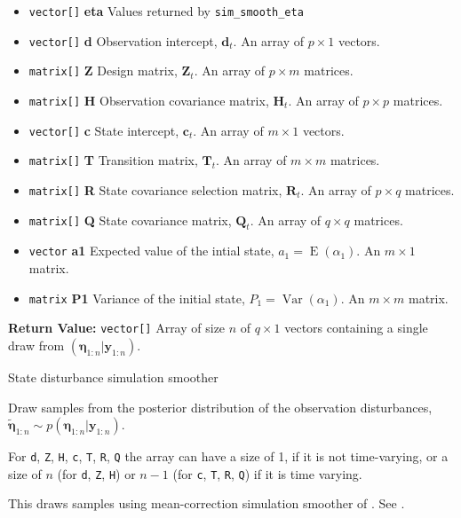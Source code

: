 \documentclass[]{book}
\providecommand{\tightlist}{%
  \setlength{\itemsep}{0pt}\setlength{\parskip}{0pt}}
\DeclareMathOperator{\E}{E}
\DeclareMathOperator{\Var}{Var}
\newcommand{\mat}[1]{\boldsymbol{#1}}
\renewcommand{\vec}[1]{\boldsymbol{#1}}
\begin{document}
\begin{itemize}
\tightlist
\item
  \texttt{vector{[}{]}} \textbf{eta} Values returned by
  \texttt{sim\_smooth\_eta}
\item
  \texttt{vector{[}{]}} \textbf{d} Observation intercept, \(\vec{d}_t\).
  An array of \(p \times 1\) vectors.
\item
  \texttt{matrix{[}{]}} \textbf{Z} Design matrix, \(\mat{Z}_t\). An
  array of \(p \times m\) matrices.
\item
  \texttt{matrix{[}{]}} \textbf{H} Observation covariance matrix,
  \(\mat{H}_t\). An array of \(p \times p\) matrices.
\item
  \texttt{vector{[}{]}} \textbf{c} State intercept, \(\vec{c}_t\). An
  array of \(m \times 1\) vectors.
\item
  \texttt{matrix{[}{]}} \textbf{T} Transition matrix, \(\mat{T}_t\). An
  array of \(m \times m\) matrices.
\item
  \texttt{matrix{[}{]}} \textbf{R} State covariance selection matrix,
  \(\mat{R} _t\). An array of \(p \times q\) matrices.
\item
  \texttt{matrix{[}{]}} \textbf{Q} State covariance matrix,
  \(\mat{Q}_t\). An array of \(q \times q\) matrices.
\item
  \texttt{vector} \textbf{a1} Expected value of the intial state,
  \(a_1 = \E(\alpha_1)\). An \(m \times 1\) matrix.
\item
  \texttt{matrix} \textbf{P1} Variance of the initial state,
  \(P_1 = \Var(\alpha_1)\). An \(m \times m\) matrix.
\end{itemize}

\textbf{Return Value:} \texttt{vector{[}{]}} Array of size \(n\) of
\(q \times 1\) vectors containing a single draw from
\((\vec{\eta}_{1:n} | \vec{y}_{1:n})\).

State disturbance simulation smoother

Draw samples from the posterior distribution of the observation
disturbances,
\(\tilde{\vec{\eta}}_{1:n} \sim p(\vec{\eta}_{1:n} | \vec{y}_{1:n})\).

For \texttt{d}, \texttt{Z}, \texttt{H}, \texttt{c}, \texttt{T},
\texttt{R}, \texttt{Q} the array can have a size of 1, if it is not
time-varying, or a size of \(n\) (for \texttt{d}, \texttt{Z},
\texttt{H}) or \(n - 1\) (for \texttt{c}, \texttt{T}, \texttt{R},
\texttt{Q}) if it is time varying.

This draws samples using mean-correction simulation smoother of
\autocite{DurbinKoopman2002}. See \autocite[Sec 4.9]{DurbinKoopman2012}.
\end{document}
